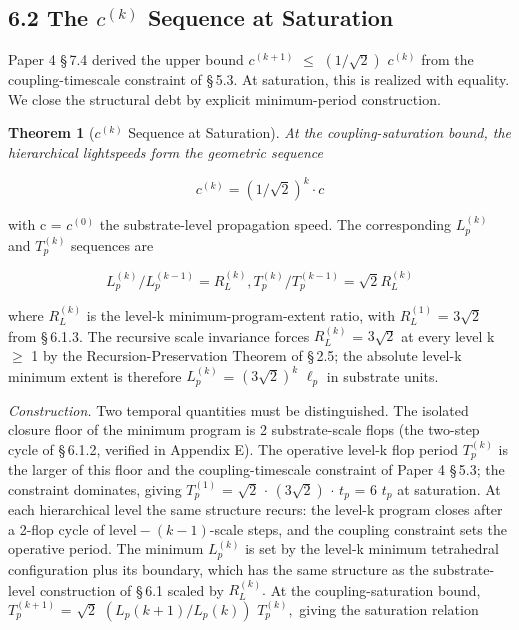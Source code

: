\documentclass[11pt,oneside]{report}
\newtheorem{theorem}{Theorem}[section]
\theoremstyle{definition}
\theoremstyle{remark}
\begin{document}
\subsection*{6.2 The \ensuremath{c^{(k)}} Sequence at Saturation}

Paper 4 \S\,7.4 derived the upper bound \ensuremath{c^{(k+1)}} \ensuremath{\leq} \ensuremath{(1/\sqrt{2})} \ensuremath{c^{(k)}} from
the coupling-timescale constraint of \S\,5.3. At saturation, this is
realized with equality. We close the structural debt by explicit
minimum-period construction.

\begin{theorem}[\ensuremath{c^{(k)}} Sequence at Saturation]
At the
coupling-saturation bound, the hierarchical lightspeeds form the
geometric sequence
\end{theorem}

\begin{equation*}
c^{(k)} = (1/\sqrt{2})^{k} \cdot c
\end{equation*}

with c = \ensuremath{c^{(0)}} the substrate-level propagation speed. The
corresponding \ensuremath{L_{p}^{(k)}} and \ensuremath{T_{p}^{(k)}} sequences are

\begin{equation*}
L_{p}^{(k)} / L_{p}^{(k-1)} = R_{L}^{(k)}, T_{p}^{(k)} /
T_{p}^{(k-1)} = \sqrt{2} R_{L}^{(k)}
\end{equation*}

where \ensuremath{R_{L}^{(k)}} is the level-k minimum-program-extent ratio, with
\ensuremath{R_{L}^{(1)}} = \ensuremath{3\sqrt{2}} from \S\,6.1.3. The recursive scale invariance forces
\ensuremath{R_{L}^{(k)}} = \ensuremath{3\sqrt{2}} at every level k \ensuremath{\geq} 1 by the Recursion-Preservation
Theorem of \S\,2.5; the absolute level-k minimum extent is therefore
\ensuremath{L_{p}^{(k)}} = \ensuremath{(3\sqrt{2})^{k}} \ensuremath{\ell_{p}} in substrate units.

\emph{Construction.} Two temporal quantities must be distinguished. The
isolated closure floor of the minimum program is 2 substrate-scale flops
(the two-step cycle of \S\,6.1.2, verified in Appendix E). The operative
level-k flop period \ensuremath{T_{p}^{(k)}} is the larger of this floor
and the coupling-timescale constraint of Paper 4 \S\,5.3; the constraint
dominates, giving \ensuremath{T_{p}^{(1)}} = \ensuremath{\sqrt{2}}
\ensuremath{\cdot} \ensuremath{(3\sqrt{2})} \ensuremath{\cdot} \ensuremath{t_{p}} = 6
\ensuremath{t_{p}} at saturation. At each hierarchical level the same
structure recurs: the level-k program closes after a 2-flop cycle of
\ensuremath{\text{level}-(k-1)}-scale steps, and the coupling constraint
sets the operative period. The minimum
\ensuremath{L_{p}^{(k)}} is set by the level-k minimum tetrahedral configuration plus
its boundary, which has the same structure as the substrate-level
construction of \S\,6.1 scaled by \ensuremath{R_{L}^{(k)}.} At the coupling-saturation
bound, \ensuremath{T_{p}^{(k+1)}} = \ensuremath{\sqrt{2}} \ensuremath{(L_{p}(k+1)/L_{p}(k))} \ensuremath{T_{p}^{(k)},} giving the
saturation relation
\end{document}
